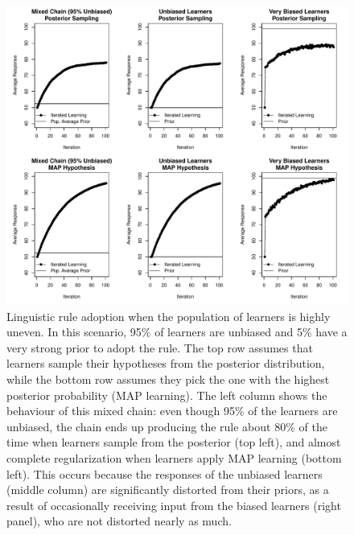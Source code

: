 \documentclass[doc]{apa6}
\begin{document}
\begin{figure}[p]
\begin{center}
\includegraphics[width=14cm]{coinsfail4.pdf} 
\caption{\small{Linguistic rule adoption when the population of learners is highly uneven. In this scenario, 95\% of learners are unbiased and 5\% have a very strong prior to adopt the rule. The top row assumes that learners sample their hypotheses from the posterior distribution, while the bottom row assumes they pick the one with the highest posterior probability (MAP learning). The left column shows the behaviour of this mixed chain: even though 95\% of the learners are unbiased, the chain ends up producing the rule about 80\% of the time when learners sample from the posterior (top left), and almost complete regularization when learners apply MAP learning (bottom left). This occurs because the responses of the unbiased learners (middle column) are significantly distorted from their priors, as a result of occasionally receiving input from the biased learners (right panel), who are not distorted nearly as much.}}
\label{coinsfail4}
\end{center}
\end{figure}
\end{document}
